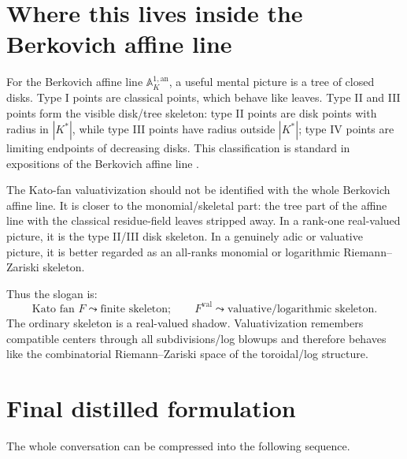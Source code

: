\documentclass[11pt]{article}
\newcommand{\A}{\mathbb A}
\newcommand{\val}{\mathrm{val}}
\newcommand{\an}{\mathrm{an}}
\begin{document}
\section{Where this lives inside the Berkovich affine line}

For the Berkovich affine line $\A^{1,\an}_K$, a useful mental picture is a tree of closed disks. Type I points are classical points, which behave like leaves. Type II and III points form the visible disk/tree skeleton: type II points are disk points with radius in $|K^\ast|$, while type III points have radius outside $|K^\ast|$; type IV points are limiting endpoints of decreasing disks. This classification is standard in expositions of the Berkovich affine line \cite{BakerBerkovichNotes,PoineauTurchetti}.

The Kato-fan valuativization should not be identified with the whole Berkovich affine line. It is closer to the monomial/skeletal part: the tree part of the affine line with the classical residue-field leaves stripped away. In a rank-one real-valued picture, it is the type II/III disk skeleton. In a genuinely adic or valuative picture, it is better regarded as an all-ranks monomial or logarithmic Riemann--Zariski skeleton.

Thus the slogan is:
\[
\boxed{
\text{Kato fan }F \leadsto \text{finite skeleton};
\qquad
F^{\val} \leadsto \text{valuative/logarithmic skeleton}.
}
\]
The ordinary skeleton is a real-valued shadow. Valuativization remembers compatible centers through all subdivisions/log blowups and therefore behaves like the combinatorial Riemann--Zariski space of the toroidal/log structure.

\section{Final distilled formulation}

The whole conversation can be compressed into the following sequence.
\end{document}
